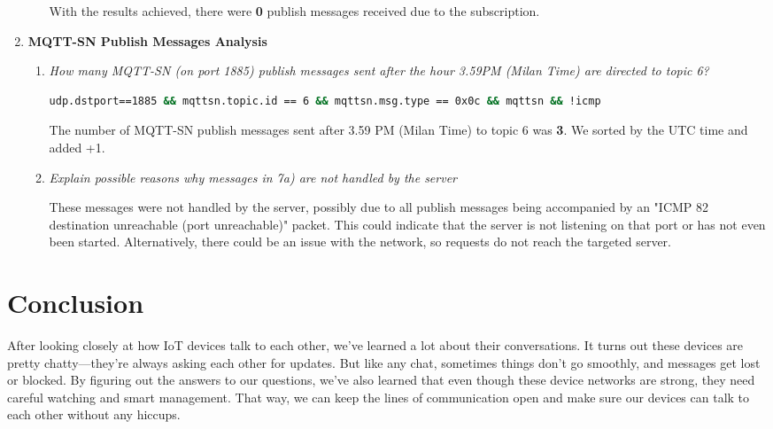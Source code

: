 \documentclass{article}
\begin{document}
\begin{enumerate}
\begin{enumerate}
        With the results achieved, there were \textbf{0} publish messages received due to the subscription.
    \end{enumerate}
    \newpage
    \item \textbf{MQTT-SN Publish Messages Analysis}
    \begin{enumerate}
        \item \textit{How many MQTT-SN (on port 1885) publish messages sent after the
hour 3.59PM (Milan Time) are directed to topic 6?}
        \begin{lstlisting}[language=bash]
udp.dstport==1885 && mqttsn.topic.id == 6 && mqttsn.msg.type == 0x0c && mqttsn && !icmp
        \end{lstlisting}
        The number of MQTT-SN publish messages sent after 3.59 PM (Milan Time) to topic 6 was \textbf{3}. We sorted by the UTC time and added +1.
        \item \textit{Explain possible reasons why messages in 7a) are not handled by the
server}

        These messages were not handled by the server, possibly due to all publish messages being accompanied by an "ICMP 82 destination unreachable (port unreachable)" packet. This could indicate that the server is not listening on that port or has not even been started. Alternatively, there could be an issue with the network, so requests do not reach the targeted server.
    \end{enumerate}
\end{enumerate}

\section{Conclusion}
After looking closely at how IoT devices talk to each other, we’ve learned a lot about their conversations. It turns out these devices are pretty chatty—they’re always asking each other for updates. But like any chat, sometimes things don’t go smoothly, and messages get lost or blocked. By figuring out the answers to our questions, we’ve also learned that even though these device networks are strong, they need careful watching and smart management. That way, we can keep the lines of communication open and make sure our devices can talk to each other without any hiccups.
\end{document}
